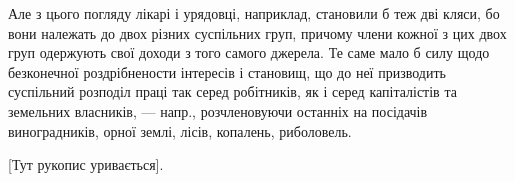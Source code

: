 Але з цього погляду лікарі і урядовці, наприклад, становили б теж дві
кляси, бо вони належать до двох різних суспільних груп, причому члени кожної
з цих двох груп одержують свої доходи з того самого джерела. Те саме мало б
силу щодо безконечної роздрібнености інтересів і становищ, що до неї призводить
суспільний розподіл праці так серед робітників, як і серед капіталістів та
земельних власників, — напр., розчленовуючи останніх на посідачів виноградників,
орної землі, лісів, копалень, риболовель.

\begin{center}
[Тут рукопис уривається].
\end{center}

\parbreak{}  %
